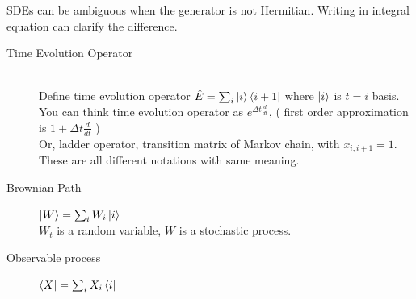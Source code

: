 \documentclass{article}
\begin{document}
SDEs can be ambiguous when the generator is not Hermitian.
Writing in integral equation can clarify the difference.

\begin{description}
    \item[Time Evolution Operator] ~\\
          Define time evolution operator $\hat{E} = \sum_i \ket{i}\bra{i+1}$ where $\ket{i}$ is $t=i$ basis. \\
          You can think time evolution operator as $e^{\Delta t \frac{d}{dt}}$, ( first order approximation is $1+\Delta t \frac{d}{dt}$ )\\
          Or, ladder operator, transition matrix of Markov chain, with $x_{i,i+1}=1$.\\
          These are all different notations with same meaning.
    \item[Brownian Path]
          $\ket{W}=\sum_i W_i \ket{i}$\\
          $W_t$ is a random variable, $W$ is a stochastic process.
    \item[Observable process]
          $\bra{X}=\sum_i X_i \bra{i}$


\end{description}
\end{document}

